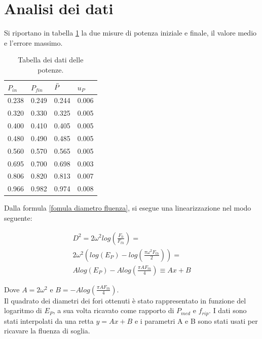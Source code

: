\documentclass{article}
\begin{document}
\section{Analisi dei dati}
Si riportano in tabella \ref{potenza} la due misure di potenza iniziale e finale, il valore medio e l'errore massimo.
\begin{table}[h!]
\centering
\begin{tabular}{llll}
$P_{in}$   & $P_{fin}$  & $\Bar{P}$  & $u_P$  \\
\hline
0.238 & 0.249 & 0.244 & 0.006 \\
\hline
0.320 & 0.330 & 0.325 & 0.005 \\
\hline
0.400 & 0.410 & 0.405 & 0.005 \\
\hline
0.480 & 0.490 & 0.485 & 0.005 \\
\hline
0.560 & 0.570 & 0.565 & 0.005 \\
\hline
0.695 & 0.700 & 0.698 & 0.003 \\
\hline
0.806 & 0.820 & 0.813 & 0.007 \\
\hline
0.966 & 0.982 & 0.974 & 0.008
\end{tabular}
\label{potenza}
\caption{Tabella dei dati delle potenze.}
\end{table}

Dalla formula \ref{fomula diametro fluenza}, si esegue una linearizzazione nel modo seguente:



\begin{equation}
\begin{split}
    D^2=2\omega^2 log(\frac{F_0}{F_{th}})= \\ 2 \omega^2 (log(E_P)-log(\frac{\pi \omega^2 F_{th}}{2}))= \\
    Alog(E_P) - Alog(\frac{\pi A F_{th}}{4}) \equiv Ax+B
\end{split}
\end{equation}

Dove $A=2\omega^2$ e $B=-Alog(\frac{\pi A F_{th}}{4})$.
\\

Il quadrato dei diametri dei fori ottenuti è stato rappresentato in funzione del logaritmo di $E_P$, a sua volta ricavato come rapporto di $P_{med}$ e $f_{rip}$.
I dati sono stati interpolati da una retta $y = Ax + B$ e i parametri A e B sono stati usati per ricavare la fluenza di soglia.
\end{document}
